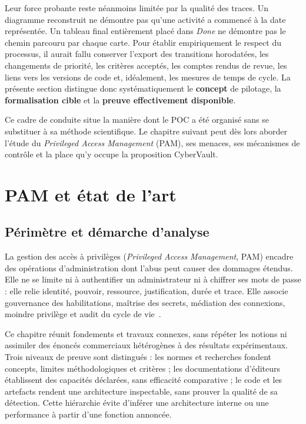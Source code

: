 \documentclass[11pt,a4paper,oneside]{report}
\theoremstyle{definition}
\theoremstyle{plain}
\begin{document}
Leur force probante reste néanmoins limitée par la qualité des traces. Un
diagramme reconstruit ne démontre pas qu'une activité a commencé à la date
représentée. Un tableau final entièrement placé dans \emph{Done} ne démontre
pas le chemin parcouru par chaque carte. Pour établir empiriquement le respect
du processus, il aurait fallu conserver l'export des transitions horodatées,
les changements de priorité, les critères acceptés, les comptes rendus de
revue, les liens vers les versions de code et, idéalement, les mesures de temps
de cycle. La présente section distingue donc systématiquement le
\textbf{concept} de pilotage, la \textbf{formalisation cible} et la
\textbf{preuve effectivement disponible}.

Ce cadre de conduite situe la manière dont le POC a été organisé sans se
substituer à sa méthode scientifique. Le chapitre suivant peut dès lors
aborder l'étude du \emph{Privileged Access Management} (PAM), ses menaces, ses
mécanismes de contrôle et la place qu'y occupe la proposition CyberVault.

\chapter{PAM et état de l'art}
\label{chap:domain}

\section{Périmètre et démarche d'analyse}

La gestion des accès à privilèges (\emph{Privileged Access Management}, PAM) encadre des opérations d'administration dont l'abus peut causer des dommages étendus. Elle ne se limite ni à authentifier un administrateur ni à chiffrer ses mots de passe : elle relie identité, pouvoir, ressource, justification, durée et trace. Elle associe gouvernance des habilitations, maîtrise des secrets, médiation des connexions, moindre privilège et audit du cycle de vie~\cite{ref1,ref2}.

Ce chapitre réunit fondements et travaux connexes, sans répéter les notions ni assimiler des énoncés commerciaux hétérogènes à des résultats expérimentaux. Trois niveaux de preuve sont distingués : les normes et recherches fondent concepts, limites méthodologiques et critères ; les documentations d'éditeurs établissent des capacités déclarées, sans efficacité comparative ; le code et les artefacts rendent une architecture inspectable, sans prouver la qualité de sa détection. Cette hiérarchie évite d'inférer une architecture interne ou une performance à partir d'une fonction annoncée.
\end{document}
